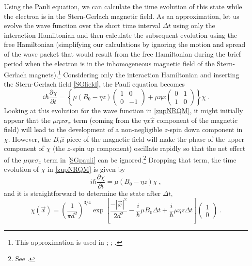 \documentclass[onecolumn,secnumarabic,amsmath,amssymb,balancelastpage,nofootinbib]{article}
\begin{document}
Using the Pauli equation, we can calculate the time evolution of this state while the electron is in the Stern-Gerlach magnetic field.  As an approximation, let us evolve the wave function over the short time interval $\Delta t$ using only the interaction Hamiltonian and then calculate the subsequent evolution using the free Hamiltonian (simplifying our calculations by ignoring the motion and spread of the wave packet that would result from the free Hamiltonian during the brief period when the electron is in the inhomogeneous magnetic field of the Stern-Gerlach magnets).\footnote{This approximation is used in \citet[example 4.4]{griffithsQM}; \citet[sec.\ 9.1]{ballentine}; \citet[sec.\ 1.7.1]{durr2020}.}  Considering only the interaction Hamiltonian and inserting the Stern-Gerlach field \eqref{SGfield}, the Pauli equation becomes
\begin{equation}
i \hbar \frac{\partial \chi}{\partial t} = \left\{ \mu(B_0-\eta z) \left(\begin{matrix} 1 & 0 \\ 0 & -1 \end{matrix}\right) + \mu \eta x \left(\begin{matrix} 0 & 1 \\  1 & 0 \end{matrix}\right)\right\}\chi
\ .
\label{SGpauli}
\end{equation}
Looking at this evolution for the wave function in \eqref{zupNRQM}, it might initially appear that the $\mu \eta x \sigma_x$ term (coming from the $\eta x \hat{x}$ component of the magnetic field) will lead to the development of a non-negligible $z$-spin down component in $\chi$.  However, the $B_0 \hat{z}$ piece of the magnetic field will make the phase of the upper component of $\chi$ (the $z$-spin up component) oscillate rapidly so that the net effect of the $\mu \eta x \sigma_x$ term in \eqref{SGpauli} can be ignored.\footnote{See \citet{platt1992}.}  Dropping that term, the time evolution of $\chi$ in \eqref{zupNRQM} is given by
\begin{equation}
i \hbar \frac{\partial \chi}{\partial t} = \mu(B_0-\eta z) \chi
\ ,
\end{equation}
and it is straightforward to determine the state after $\Delta t$,
\begin{equation}
\chi(\vec{x}) = \left(\frac{1}{\pi d^2}\right)^{3/4}  \exp\left[\frac{-|\vec{x}|^2}{2 d^2} - \frac{i}{\hbar}\mu B_0 \Delta t + \frac{i}{\hbar}\mu \eta z \Delta t\right] \left(\begin{matrix} 1\\0 \end{matrix}\right)
\ .
\label{zupNRQMafter}
\end{equation}
\end{document}
